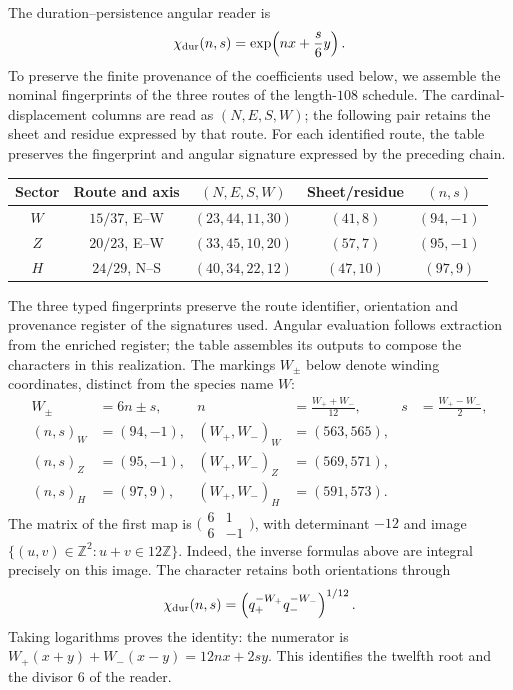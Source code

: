 The duration--persistence angular reader is
\begin{equation}
 \chi_{\rm dur}(n,s)=\exp\!\left(nx+\frac{s}{6}y\right).
 \label{amp-higgs-caracter}
\end{equation}
To preserve the finite provenance of the coefficients used below, we assemble
the nominal fingerprints of the three routes of the length-$108$ schedule.
The cardinal-displacement columns are read as $(N,E,S,W)$; the following
pair retains the sheet and residue expressed by that route. For each
identified route, the table preserves the fingerprint and angular signature
expressed by the preceding chain.
\begin{center}
\small
\begin{tabular}{c c c c c}
\hline
Sector & Route and axis & $(N,E,S,W)$ & Sheet/residue & $(n,s)$\\
\hline
$W$ & $15/37$, E--W & $(23,44,11,30)$ & $(41,8)$ & $(94,-1)$\\
$Z$ & $20/23$, E--W & $(33,45,10,20)$ & $(57,7)$ & $(95,-1)$\\
$H$ & $24/29$, N--S & $(40,34,22,12)$ & $(47,10)$ & $(97,9)$\\
\hline
\end{tabular}
\end{center}
The three typed fingerprints preserve the route identifier, orientation
and provenance register of the signatures used. Angular evaluation follows
extraction from the enriched register; the table assembles its outputs to
compose the characters in this realization. The markings $W_\pm$ below
denote winding coordinates, distinct from the species name $W$:
\begin{equation}
 \begin{aligned}
 W_\pm&=6n\pm s, &
 n&=\frac{W_++W_-}{12},& s&=\frac{W_+-W_-}{2},\\
 (n,s)_W&=(94,-1), & (W_+,W_-)_W&=(563,565),\\
 (n,s)_Z&=(95,-1), & (W_+,W_-)_Z&=(569,571),\\
 (n,s)_H&=(97,9), & (W_+,W_-)_H&=(591,573).
 \end{aligned}
 \label{amp-higgs-firmas}
\end{equation}
The matrix of the first map is
$\bigl(\begin{smallmatrix}6&1\\6&-1\end{smallmatrix}\bigr)$, with determinant
$-12$ and image $\{(u,v)\in\mathbb Z^2:u+v\in12\mathbb Z\}$.
Indeed, the inverse formulas above are integral precisely on this image.
The character retains both orientations through
\begin{equation}
 \chi_{\rm dur}(n,s)
 =\left(q_+^{-W_+}q_-^{-W_-}\right)^{1/12}.
 \label{amp-higgs-caracter-canales}
\end{equation}
Taking logarithms proves the identity: the numerator is
$W_+(x+y)+W_-(x-y)=12nx+2sy$.
This identifies the twelfth root and the divisor $6$ of the reader.

